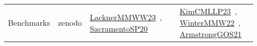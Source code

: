 {\begin{longtable}{lp{3cm}>{\raggedright\arraybackslash}p{6cm}>{\raggedright\arraybackslash}p{6cm}>{\raggedright\arraybackslash}p{8cm}}
Benchmarks & zenodo & \href{works/LacknerMMWW23.pdf}{LacknerMMWW23}~\cite{LacknerMMWW23}, \href{works/SacramentoSP20.pdf}{SacramentoSP20}~\cite{SacramentoSP20} &  & \href{works/KimCMLLP23.pdf}{KimCMLLP23}~\cite{KimCMLLP23}, \href{works/WinterMMW22.pdf}{WinterMMW22}~\cite{WinterMMW22}, \href{works/ArmstrongGOS21.pdf}{ArmstrongGOS21}~\cite{ArmstrongGOS21}\\
\end{longtable}
}

